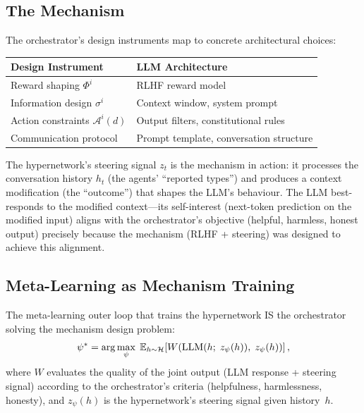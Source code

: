 \subsection{The Mechanism}
\label{subsec:llm-mechanism}

The orchestrator's design instruments map to concrete architectural choices:
\begin{center}
\renewcommand{\arraystretch}{1.3}
\begin{tabular}{ll}
\textbf{Design Instrument} & \textbf{LLM Architecture} \\
\hline
Reward shaping $\Phi^i$ & RLHF reward model \\
Information design $\sigma^i$ & Context window, system prompt \\
Action constraints $\mathcal{A}^i(d)$ & Output filters, constitutional rules \\
Communication protocol & Prompt template, conversation structure \\
\end{tabular}
\end{center}

The hypernetwork's steering signal $z_t$ is the mechanism in action: it processes the conversation history $h_t$ (the agents' ``reported types'') and produces a context modification (the ``outcome'') that shapes the LLM's behaviour. The LLM best-responds to the modified context---its self-interest (next-token prediction on the modified input) aligns with the orchestrator's objective (helpful, harmless, honest output) precisely because the mechanism (RLHF + steering) was designed to achieve this alignment.

\subsection{Meta-Learning as Mechanism Training}
\label{subsec:mechanism-training}

The meta-learning outer loop that trains the hypernetwork IS the orchestrator solving the mechanism design problem:
\begin{equation}\label{eq:llm-meta-objective}
  \psi^* = \arg\max_\psi\; \mathbb{E}_{h \sim \mathcal{H}}\!\left[W\!\left(\text{LLM}(h;\; z_\psi(h)),\; z_\psi(h)\right)\right],
\end{equation}
where $W$ evaluates the quality of the joint output (LLM response + steering signal) according to the orchestrator's criteria (helpfulness, harmlessness, honesty), and $z_\psi(h)$ is the hypernetwork's steering signal given history~$h$.

